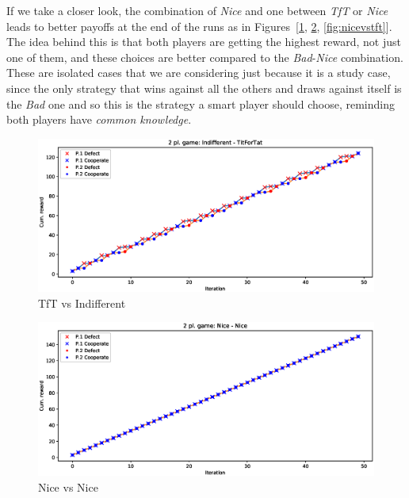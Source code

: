 \documentclass[journal,a4paper,10pt,twoside]{IEEEtran} %
\begin{document}
If we take a closer look, the combination of \textit{Nice} and one between \textit{TfT} or \textit{Nice} leads to better payoffs at the end of the runs as in Figures~[\ref{fig:tftvsindiff}, \ref{fig:nicevsnice}, \ref{fig:nicevstft}]. The idea behind this is that both players are getting the highest reward, not just one of them, and these choices are better compared to the \textit{Bad}-\textit{Nice} combination.
These are isolated cases that we are considering just because it is a study case, since the only strategy that wins against all the others and draws against itself is the \textit{Bad} one and so this is the strategy a smart player should choose, reminding both players have \textit{common knowledge}.

\begin{figure}[!ht]
    \centering
    \includegraphics[width=1\columnwidth]{../img/ipd2p/ipd2p-rewards-Indifferent-TitForTat}
    \caption{TfT vs Indifferent}
    \label{fig:tftvsindiff}
\end{figure}

\begin{figure}[!ht]
    \centering
    \includegraphics[width=1\columnwidth]{../img/ipd2p/ipd2p-rewards-Nice-Nice}
    \caption{Nice vs Nice}
    \label{fig:nicevsnice}
\end{figure}
\end{document}
